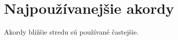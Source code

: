 \begingroup %

\large

\section*{Najpoužívanejšie akordy}

Akordy bližšie stredu sú používané častejšie.

\bigskip
\bigskip

\begin{centering}
 \qquad
{} \qquad
{} \qquad
{} \qquad
{} \qquad
{}
\bigskip

 \qquad
{} \qquad
{} \qquad
{} \qquad
{} \qquad
{}

\bigskip

 \qquad
{} \qquad
{} \qquad
{} \qquad
{} \qquad
{}

\end{centering}

\endgroup

\newpage










